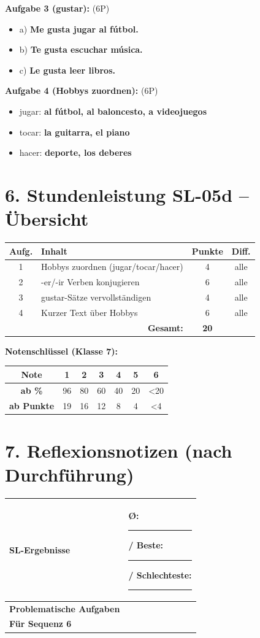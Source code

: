 \documentclass[11pt, a4paper]{article}
\newcommand{\loesung}[1]{\textcolor{loesung}{\textbf{#1}}}
\begin{document}
\textbf{Aufgabe 3 (gustar):} (6P)
\begin{itemize}
    \item a) \loesung{Me gusta jugar al fútbol.}
    \item b) \loesung{Te gusta escuchar música.}
    \item c) \loesung{Le gusta leer libros.}
\end{itemize}

\textbf{Aufgabe 4 (Hobbys zuordnen):} (6P)
\begin{itemize}
    \item jugar: \loesung{al fútbol, al baloncesto, a videojuegos}
    \item tocar: \loesung{la guitarra, el piano}
    \item hacer: \loesung{deporte, los deberes}
\end{itemize}

\section*{6. Stundenleistung SL-05d -- Übersicht}

\begin{tabular}{|c|l|c|c|}
\hline
\textbf{Aufg.} & \textbf{Inhalt} & \textbf{Punkte} & \textbf{Diff.} \\
\hline
1 & Hobbys zuordnen (jugar/tocar/hacer) & 4 & alle \\
\hline
2 & -er/-ir Verben konjugieren & 6 & alle \\
\hline
3 & gustar-Sätze vervollständigen & 4 & alle \\
\hline
4 & Kurzer Text über Hobbys & 6 & alle \\
\hline
\multicolumn{2}{|r|}{\textbf{Gesamt:}} & \textbf{20} & \\
\hline
\end{tabular}

\vspace{1em}

\textbf{Notenschlüssel (Klasse 7):}

\begin{tabular}{|c|c|c|c|c|c|c|}
\hline
\textbf{Note} & 1 & 2 & 3 & 4 & 5 & 6 \\
\hline
\textbf{ab \%} & 96 & 80 & 60 & 40 & 20 & <20 \\
\hline
\textbf{ab Punkte} & 19 & 16 & 12 & 8 & 4 & <4 \\
\hline
\end{tabular}

\section*{7. Reflexionsnotizen (nach Durchführung)}

\begin{tabularx}{\textwidth}{|l|X|}
\hline
\textbf{SL-Ergebnisse} & Ø: \rule{2cm}{0.4pt} / Beste: \rule{1cm}{0.4pt} / Schlechteste: \rule{1cm}{0.4pt} \\[1.5em]
\hline
\textbf{Problematische Aufgaben} & \\[2em]
\hline
\textbf{Für Sequenz 6} & \\[2em]
\hline
\end{tabularx}
\end{document}
